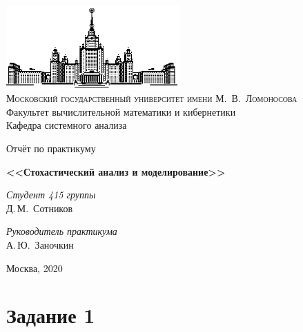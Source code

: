 \documentclass[16pt]{article}
\begin{document}
\thispagestyle{empty}

\begin{center}
\ \vspace{-3cm}

\includegraphics[width=0.5\textwidth]{msu.eps}\\
{\scshape Московский государственный университет имени М.~В.~Ломоносова}\\
Факультет вычислительной математики и кибернетики\\
Кафедра системного анализа

\vfill

{\LARGE Отчёт по практикуму}

\vspace{1cm}

{\LARGE\bfseries <<Стохастический анализ и моделирование>>}
\end{center}

\vspace{1cm}

\begin{flushright}
  \large
  \textit{Студент 415 группы}\\
  Д.\,М.~Сотников

  \vspace{5mm}

  \textit{Руководитель практикума}\\
  А.\,Ю.~Заночкин
\end{flushright}

\vfill

\begin{center}
Москва, 2020
\end{center}

\newpage

\tableofcontents

\newpage 

\section{Задание 1}
\end{document}
